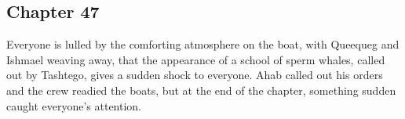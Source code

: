 \subsection{Chapter 47}

Everyone is lulled by the comforting atmosphere on the boat, with Queequeg and
Ishmael weaving away, that the appearance of a school of sperm whales, called
out by Tashtego, gives a sudden shock to everyone. Ahab called out his orders
and the crew readied the boats, but at the end of the chapter, something sudden
caught everyone's attention.
